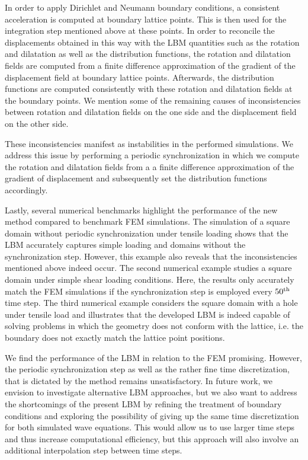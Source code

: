 \documentclass{article}
\begin{document}
In order to apply Dirichlet and Neumann boundary conditions, a consistent acceleration is computed at boundary lattice points. This is then used for the integration step mentioned above at these points. In order to reconcile the displacements obtained in this way with the LBM quantities such as the rotation and dilatation as well as the distribution functions, the rotation and dilatation fields are computed from a finite difference approximation of the gradient of the displacement field at boundary lattice points. Afterwards, the distribution functions are computed consistently with these rotation and dilatation fields at the boundary points. We mention some of the remaining causes of inconsistencies between rotation and dilatation fields on the one side and the displacement field on the other side. 

These inconsistencies manifest as instabilities in the performed simulations. We address this issue by performing a periodic synchronization in which we compute the rotation and dilatation fields from a a finite difference approximation of the gradient of displacement and subsequently set the distribution functions accordingly.

Lastly, several numerical benchmarks highlight the performance of the new method compared to benchmark FEM simulations. The simulation of a square domain without periodic synchronization under tensile loading shows that the LBM accurately captures simple loading and domains without the synchronization step. However, this example also reveals that the inconsistencies mentioned above indeed occur. 
The second numerical example studies a square domain under simple shear loading conditions. Here, the results only accurately match the FEM simulations if the synchronization step is employed every $50^{\rm th}$ time step. The third numerical example considers the square domain with a hole under tensile load and illustrates that the developed LBM is indeed capable of solving problems in which the geometry does not conform with the lattice, i.e. the boundary does not exactly match the lattice point positions.

We find the performance of the LBM in relation to the FEM promising. However, the periodic synchronization step as well as the rather fine time discretization, that is dictated by the method remains unsatisfactory. In future work, we envision to investigate alternative LBM approaches, but we also want to address the shortcomings of the present LBM by refining the treatment of boundary conditions and exploring the possibility of giving up the same time discretization for both simulated wave equations. This would allow us to use larger time steps and thus increase computational efficiency, but this approach will also involve an additional interpolation step between time steps.
\end{document}
